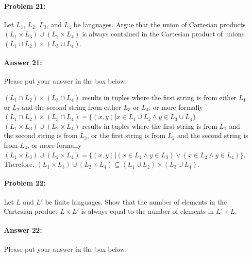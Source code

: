 \documentclass[10pt]{article}
\newenvironment{AnswerBox}{\begin{mdframed}[style=simple]}{\end{mdframed}}
\begin{document}
\noindent\hrulefill %

\paragraph{Problem 21:}
Let $L_1$, $L_2$, $L_3$, and $L_4$ be languages. Argue that the union of
Cartesian products $(L_1 \times L_3) \cup (L_2 \times L_4)$ is always contained
in the Cartesian product of unions $(L_1 \cup L_2) \times (L_3 \cup L_4)$.

\paragraph{Answer 21:} Please put your answer in the box below.

\begin{AnswerBox}%

  $(L_1 \cap L_2) \times (L_3 \cap L_4)$ results in tuples where the first string is from either $L_1$ or $L_2$ and the second string from either $L_3$ or $L_4$, or more formally $(L_1 \cap L_2) \times (L_3 \cap L_4) = \{(x, y) | x \in L_1 \cup L_2 \land y \in L_3 \cup L_4\}$. $(L_1 \times L_3) \cup (L_2 \times L_4)$ results in tuples where the first string is from $L_1$ and the second string is from $L_3$, or the first string is from $L_2$ and the second string is from $L_4$, or more formally $(L_1 \times L_3) \cup (L_2 \times L_4) = \{(x, y) | (x \in L_1 \land y \in L_3) \lor (x \in L_2 \land y \in L_4)\}$. Therefore, $(L_1 \times L_3) \cup (L_2 \times L_4) \subseteq (L_1 \cup L_2) \times (L_3 \cup L_4)$.

\end{AnswerBox}%

\noindent\hrulefill %

\paragraph{Problem 22:}
Let $L$ and $L'$ be finite languages. Show that the number of elements in the
Cartesian product $L \times L'$ is always equal to the number of elements in $L'
\times L$.

\paragraph{Answer 22:} Please put your answer in the box below.
\end{document}
